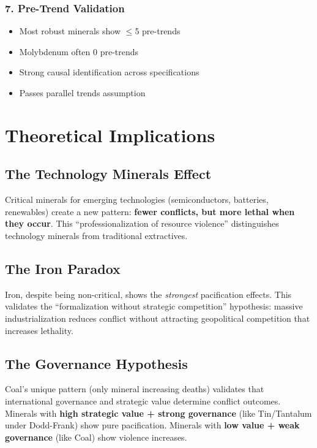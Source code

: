 \documentclass[11pt]{article}
\begin{document}
\subsubsection{7. Pre-Trend Validation}
\begin{itemize}
\item Most robust minerals show $\leq$5 pre-trends
\item Molybdenum often 0 pre-trends
\item Strong causal identification across specifications
\item Passes parallel trends assumption
\end{itemize}

\section{Theoretical Implications}

\subsection{The Technology Minerals Effect}
Critical minerals for emerging technologies (semiconductors, batteries, renewables) create a new pattern: \textbf{fewer conflicts, but more lethal when they occur}. This ``professionalization of resource violence'' distinguishes technology minerals from traditional extractives.

\subsection{The Iron Paradox}
Iron, despite being non-critical, shows the \textit{strongest} pacification effects. This validates the ``formalization without strategic competition'' hypothesis: massive industrialization reduces conflict without attracting geopolitical competition that increases lethality.

\subsection{The Governance Hypothesis}
Coal's unique pattern (only mineral increasing deaths) validates that international governance and strategic value determine conflict outcomes. Minerals with \textbf{high strategic value + strong governance} (like Tin/Tantalum under Dodd-Frank) show pure pacification. Minerals with \textbf{low value + weak governance} (like Coal) show violence increases.
\end{document}
